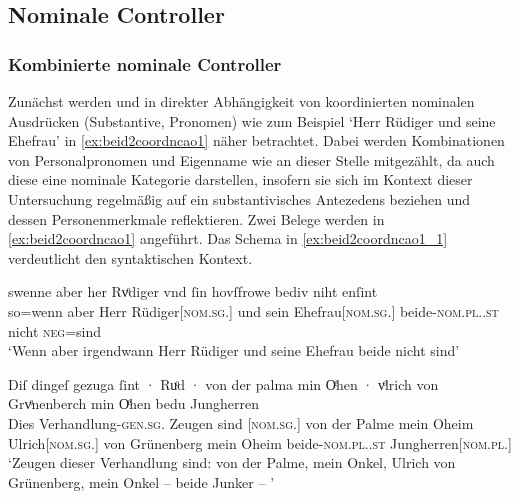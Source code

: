 \subsection{Nominale Controller}
\subsubsection{Kombinierte nominale Controller}
\label{subsubsec:perscombsgnp}

Zunächst werden  und  in direkter Abhängigkeit von
koordinierten nominalen Ausdrücken (Substantive, Pronomen) wie zum Beispiel
 `Herr Rüdiger und seine Ehefrau' in
\cref{ex:beid2coordncao1} näher betrachtet. Dabei werden Kombinationen von
Personalpronomen und Eigenname wie  an dieser Stelle
mitgezählt, da auch diese eine nominale Kategorie darstellen, insofern sie
sich im Kontext dieser Untersuchung regelmäßig auf ein substantivisches
Antezedens beziehen und dessen Personenmerkmale reflektieren.
Zwei Belege werden in \cref{ex:beid2coordncao1} angeführt. Das Schema in
\cref{ex:beid2coordncao1_1} verdeutlicht den syntaktischen Kontext.

\begin{exe}
\ex \label{ex:beid2coordncao1}
\begin{xlist}
	\ex \label{ex:beid2coordncao1_1}
		\gll swenne aber her Rvͦdiger vnd ſin
			hovſfrowe bediv niht enſint\\
			so=wenn aber Herr Rüdiger[\textsc{nom.sg.\MascM}] und sein
			Ehefrau[\textsc{nom.sg.\FemF}] beide-\textsc{nom.pl.\NeutMF.st} nicht
			\textsc{neg}=sind\\
			\trans `Wenn aber irgendwann Herr Rüdiger und seine Ehefrau
				beide nicht  sind'
				\parencites(Nr.~3262, Regensburg, 1299)[425,13--14]{cao4}

	\ex \label{ex:beid2coordncao1_2}
		\gll Diſ dingeſ gezuga ſint · Ruͦd · von der palma
			min Oͤhen · vͦlrich von Grvͤnenberch min Oͤhen
			bedu Jungherren \\
			Dies Verhandlung-\textsc{gen.sg.\NeutI} Zeugen sind {}
			[\textsc{nom.sg.\MascM}] {} von der Palme mein Oheim {}
			Ulrich[\textsc{nom.sg.\MascM}] von Grünenberg mein Oheim
			beide-\textsc{nom.pl.\NeutM.st} Jungherren[\textsc{nom.pl.\MascM}] \\
		\trans `Zeugen dieser Verhandlung sind:  von der Palme,
			mein Onkel, Ulrich von Grünenberg, mein Onkel -- beide Junker --
			\textelp{}'
				\parencites(Nr.~2915, Kl.~St.~Urban, Kt.~Luzern, 1298)[213,33--35]{cao4}
\end{xlist}
\end{exe}

